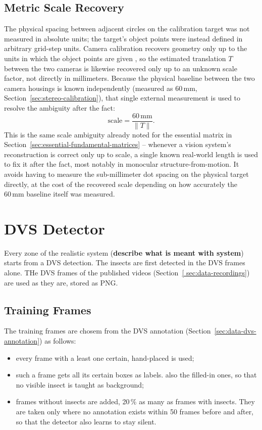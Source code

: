 \subsection{Metric Scale Recovery}
\label{sec:scale-recovery}

The physical spacing between adjacent circles on the calibration target was
not measured in absolute units; the target's object points were instead
defined in arbitrary grid-step units. Camera calibration recovers geometry
only up to the units in which the object points are given
\parencite{zhang2000}, so the estimated translation $T$ between the two
cameras is likewise recovered only up to an unknown scale factor, not
directly in millimeters. Because the physical baseline between the two
camera housings is known independently (measured as $60\,\text{mm}$,
Section~\ref{sec:stereo-calibration}), that single external measurement is
used to resolve the ambiguity after the fact:
\begin{equation}
    \text{scale} = \frac{60\,\text{mm}}{\lVert T \rVert}.
\end{equation}
This is the same scale ambiguity already noted for the essential matrix in
Section~\ref{sec:essential-fundamental-matrices} \parencite{longuet-higgins_computer_1981}
-- whenever a vision system's reconstruction is correct only up to scale, a
single known real-world length is used to fix it after the fact, most
notably in monocular structure-from-motion. It avoids having to measure the
sub-millimeter dot spacing on the physical target directly, at the cost of
the recovered scale depending on how accurately the $60\,\text{mm}$ baseline
itself was measured.

\section{DVS Detector}
\label{sec:dvs-detector}

Every zone of the realistic system (\textbf{describe what is meant with system}) starts from a DVS detection.
The insects are first detected in the DVS frames alone. THe DVS frames of the published videos (Section~\ref{
sec:data-recordings}) are used as they are, stored as PNG.

\subsection{Training Frames}

The training frames are chosem from the DVS annotation (Section~\ref{sec:data-dvs-annotation}) as follows:
\begin{itemize}
    \item every frame with a least one certain, hand-placed is used;
    \item such a frame gets all its certain boxes as labels. also the filled-in ones, so that no visible insect 
    is taught as background;
    \item frames without insects are added, 20\,\% as many as frames with insects. They are taken only where no 
    annotation exists within 50 frames before and after, so that the detector also learns to stay silent.
\end{itemize}


